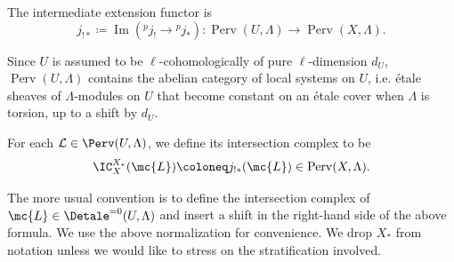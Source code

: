 \documentclass[letterpaper,11pt]{amsart}
\begin{document}
\begin{definition}{\label{defn: intermediateextension}}
The intermediate extension functor is 
    \[j_{!\ast}\coloneq \operatorname{Im}({}^pj_!\to {}^pj_\ast): \operatorname{Perv}(U,\Lambda)\to \operatorname{Perv}(X,\Lambda).\]
\end{definition}
Since $U$ is assumed to be $\ell$-cohomologically of pure $\ell$-dimension $d_U$, $\operatorname{Perv}(U,\Lambda)$ contains the abelian category of local systems on $U$, i.e. \'etale sheaves of $\Lambda$-modules on $U$ that become constant on an \'etale cover when $\Lambda$ is torsion, up to a shift by $d_U$. 

\begin{definition}\label{defn: IntersectionComplex}
For each $\mathcal{L} \in \Perv(U,\Lambda)$, we define its intersection complex to be 
\[\IC^{X_\ast}_X(\mc{L})\coloneq j_{!\ast} (\mc{L})\in \operatorname{Perv}(X,\Lambda).\]
\end{definition}
\begin{remark}
    The more usual convention is to define the intersection complex of $\mc{L}\in \Detale^{=0}(U,\Lambda)$ and insert a shift in the right-hand side of the above formula. We use the above normalization for convenience. We drop $X_\ast$ from notation unless we would like to stress on the stratification involved. 
\end{remark}
\end{document}
